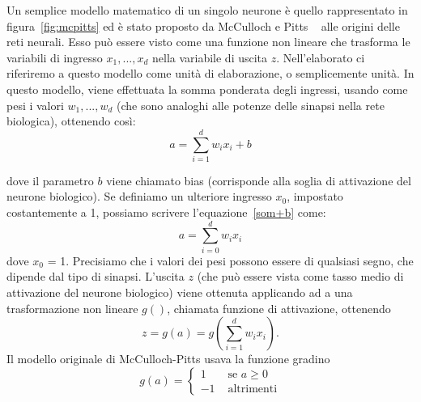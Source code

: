 \documentclass[11pt,a4paper,twoside,
openright]{book}
\begin{document}
Un semplice modello matematico di un singolo neurone è quello rappresentato in figura~\ref{fig:mcpitts} ed è stato proposto da McCulloch e Pitts ~\cite{McCulloch:1943aa} alle origini delle reti neurali. Esso può essere visto come una funzione non lineare che trasforma le variabili di ingresso $x_{1}, ..., x_{d}$ nella variabile di uscita $z$. Nell’elaborato ci riferiremo a questo modello come unità di elaborazione, o semplicemente unità.
In questo modello, viene effettuata la somma ponderata degli ingressi, usando come pesi i valori $w_{1}, ..., w_{d}$ (che sono analoghi alle potenze delle sinapsi nella rete biologica), ottenendo così:
\begin{equation}
a = \sum\limits_{i=1}^d w_{i}x_{i}+b
\label{som+b}
\end{equation}

dove il parametro $b$ viene chiamato bias (corrisponde alla soglia di attivazione del neurone biologico). Se definiamo un ulteriore ingresso $x_{0}$, impostato costantemente a 1, possiamo scrivere l'equazione~\eqref{som+b} come:
\begin{equation}
a = \sum\limits_{i=0}^d w_{i}x_{i}
\label{som}
\end{equation}
dove $x_{0}$ = 1. Precisiamo che i valori dei pesi possono essere di qualsiasi segno, che dipende dal tipo di sinapsi. L’uscita $z$ (che può essere vista come tasso medio di attivazione del neurone biologico) viene ottenuta applicando ad a una trasformazione non lineare $g()$, chiamata funzione di attivazione, ottenendo 
\begin{equation}
z=g(a)=g\left( \sum\limits_{i=1}^d w_{i}x_{i} \right).
\label{act+som}
\end{equation}
Il modello originale di McCulloch-Pitts usava la funzione gradino
\begin{equation}
g(a)=
\begin{cases}
1 &\text{ se } a\geq0 \\
-1 &\text{ altrimenti}
\end{cases}
\label{act+som}
\end{equation}
\end{document}
